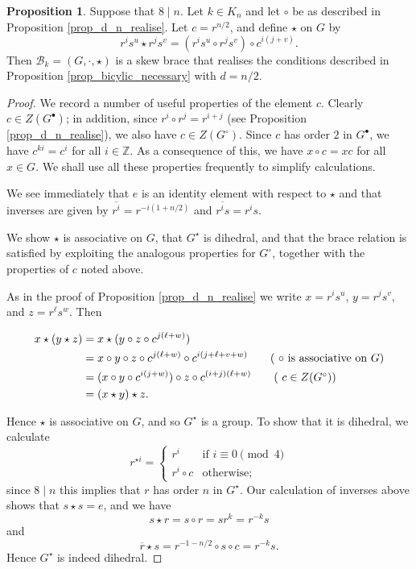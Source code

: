 \documentclass[reqno]{amsart}
\theoremstyle{definition}
\newtheorem{proposition}[theorem]{Proposition}
\newcommand{\Z}{\mathbb{Z}}
\renewcommand{\bar}{\overline}
\begin{document}
\begin{proposition} \label{prop_d_n_2_realise}
Suppose that $ 8 \mid n $. Let $ k \in K_{n} $ and let $ \circ $ be as described in Proposition \ref{prop_d_n_realise}. Let $ c=r^{n/2} $, and define $ \star $ on $ G $ by
\[ r^{i}s^{u} \star r^{j}s^{v} = \left( r^{i}s^{u} \circ r^{j}s^{v} \right) \circ c^{i(j+v)}. \]
Then $ \mathscr{B}_{k} = (G,\cdot,\star) $ is a skew brace that realises the conditions described in Proposition \ref{prop_bicylic_necessary} with $ d=n/2 $. 
\end{proposition}
\begin{proof}
We record a number of useful properties of the element $ c $. Clearly $ c \in Z(G^{\bullet}) $; in addition, since  $ r^{i} \circ r^{j} = r^{i+j} $ (see Proposition \ref{prop_d_n_realise}), we also have $ c \in Z(G^{\circ}) $.  
Since $ c $ has order $ 2 $ in $ G^{\bullet} $, we have $ c^{ki} = c^{i} $ for all $ i \in \Z $. As a consequence of this, we have $ x \circ c = xc $ for all $ x \in G $. We shall use all these properties frequently to simplify calculations. 

We see immediately that $ e $ is an identity element with respect to $ \star $ and that inverses are given by $ \bar{r^{i}} = r^{-i(1 + n/2)} $ and $ \bar{r^{i}s} = r^{i}s $. 

We show $ \star $ is associative on $ G $, that $ G^{\star} $ is dihedral, and that the brace relation is satisfied by exploiting the analogous properties for $ G^{\circ} $, together with the properties of $ c $ noted above.

As in the proof of Proposition \ref{prop_d_n_realise} we write $ x=r^{i}s^{u} $, $ y=r^{j}s^{v} $, and $ z=r^{\ell}s^{w} $. Then

\begin{align*}
x \star (y \star z) &= x \star (y \circ z \circ c^{j(\ell+w)} ) \\
&= x \circ y \circ z \circ c^{j(\ell+w)} \circ c^{i(j + \ell + v + w)} \tag{ $ \circ $ is associative on $ G $} \\
&= (x \circ y \circ c^{i(j+w)} ) \circ z \circ c^{(i+j)(\ell+w)} \tag{ $ c \in Z(G^{\circ}) $}\\
&= (x \star y) \star z.
\end{align*}

Hence $ \star $ is associative on $ G $, and so $ G^{\star} $ is a group. To show that it is dihedral, we calculate 
\[ r^{\star i} = \left\{ \begin{array}{ll} r^{i} & \mbox{if } i \equiv 0 \pmod{4} \\ r^{i} \circ c & \mbox{otherwise; } \end{array} \right. \]
since $ 8 \mid n $ this implies that $ r $ has order $ n $ in $ G^{\star} $. Our calculation of inverses above shows that $ s \star s = e $, and we have
\[ s \star r = s \circ r = sr^{k} = r^{-k}s \]
and
\[ \bar{r} \star s = r^{-1-n/2} \circ s \circ c = r^{-k}s. \]
Hence $ G^{\star} $ is indeed dihedral. 


\end{proof}
\end{document}
